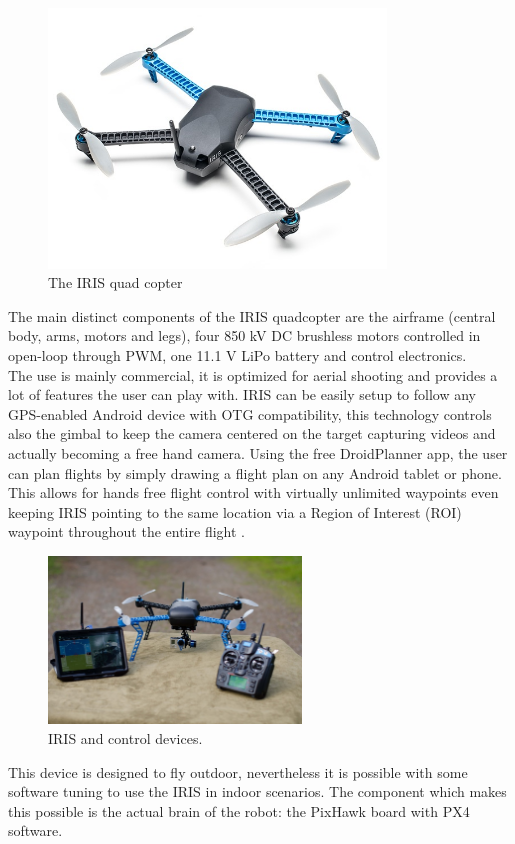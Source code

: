 \begin{figure}[h]
\centering
 \noindent
 \includegraphics[width=0.8\textwidth]{iris.jpg}
 \caption{The IRIS quad copter}
 \label{figure:iris}
\end{figure}
\noindent
The main distinct components of the IRIS quadcopter are the airframe (central body, arms, motors and legs), four 850 kV DC brushless motors controlled in open-loop through PWM, one 11.1 V LiPo battery and control electronics.\\ 
The use is mainly commercial, it is optimized for aerial shooting and provides a lot of features the user can play with. IRIS can be easily setup to follow any GPS-enabled Android device with OTG compatibility, this technology controls also the gimbal to keep the camera centered on the target capturing videos and actually becoming a free hand camera. Using the free DroidPlanner app, the user can plan flights by simply drawing a flight plan on any Android tablet or phone. This allows for hands free flight control with virtually unlimited waypoints even keeping IRIS pointing to the same location via a Region of Interest (ROI) waypoint throughout the entire flight \cite{IRIS}.


\begin{figure}[h]
 \centering
 \includegraphics[width=0.6\textwidth]{iris_planner.jpg}
 \caption[IRIS and control devices]{IRIS and control devices.}
 \label{figure:iris_planner}
\end{figure}
This device is designed to fly outdoor, nevertheless it is possible with some software tuning to use the IRIS in indoor scenarios. The component which makes this possible is the actual brain of the robot: the PixHawk board with PX4 software. 

